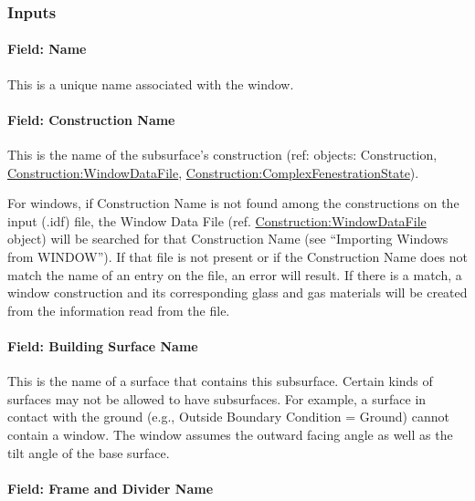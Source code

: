 \subsubsection{Inputs}\label{inputs-14-016}

\paragraph{Field: Name}\label{field-name-10-018}

This is a unique name associated with the window.

\paragraph{Field: Construction Name}\label{field-construction-name-10}

This is the name of the subsurface's construction (ref: objects: Construction, \hyperref[constructionwindowdatafile]{Construction:WindowDataFile}, \hyperref[constructioncomplexfenestrationstate]{Construction:ComplexFenestrationState}).

For windows, if Construction Name is not found among the constructions on the input (.idf) file, the Window Data File (ref. \hyperref[constructionwindowdatafile]{Construction:WindowDataFile} object) will be searched for that Construction Name (see ``Importing Windows from WINDOW''). If that file is not present or if the Construction Name does not match the name of an entry on the file, an error will result. If there is a match, a window construction and its corresponding glass and gas materials will be created from the information read from the file.

\paragraph{Field: Building Surface Name}\label{field-building-surface-name-000}

This is the name of a surface that contains this subsurface. Certain kinds of surfaces may not be allowed to have subsurfaces. For example, a surface in contact with the ground (e.g., Outside Boundary Condition = Ground) cannot contain a window. The window assumes the outward facing angle as well as the tilt angle of the base surface.

\paragraph{Field: Frame and Divider Name}\label{field-frame-and-divider-name}

